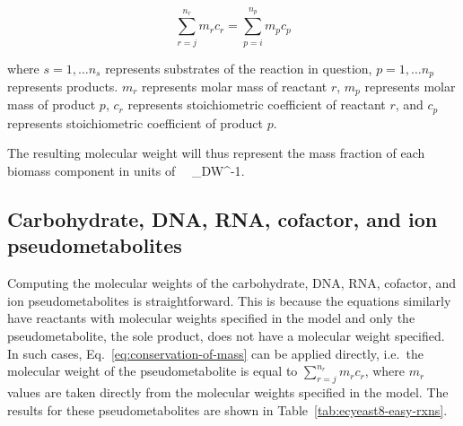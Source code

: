 \begin{equation}
  \sum_{r = j}^{n_{r}}m_{r}c_{r} = \sum_{p = i}^{n_{p}}m_{p}c_{p}
\label{eq:conservation-of-mass}
\end{equation}

where
$s = 1, \ldots n_{s}$ represents substrates of the reaction in question,
$p = 1, \ldots n_{p}$ represents products.
$m_{r}$ represents molar mass of reactant $r$,
$m_{p}$ represents molar mass of product $p$,
$c_{r}$ represents stoichiometric coefficient of reactant $r$, and
$c_{p}$ represents stoichiometric coefficient of product $p$.

The resulting molecular weight will thus represent the mass fraction of each biomass component in units of \SI{}{\gram~\gram_{DW}^{-1}}.


\subsection{Carbohydrate, DNA, RNA, cofactor, and ion pseudometabolites}
\label{append:model-molweights-easy}

Computing the molecular weights of the carbohydrate, DNA, RNA, cofactor, and ion pseudometabolites is straightforward.
This is because the equations similarly have reactants with molecular weights specified in the model and only the pseudometabolite, the sole product, does not have a molecular weight specified.
In such cases, Eq.\ \ref{eq:conservation-of-mass} can be applied directly, i.e.\ the molecular weight of the pseudometabolite is equal to $\sum_{r = j}^{n_{r}}m_{r}c_{r}$, where $m_{r}$ values are taken directly from the molecular weights specified in the model.
The results for these pseudometabolites are shown in Table~\ref{tab:ecyeast8-easy-rxns}.

